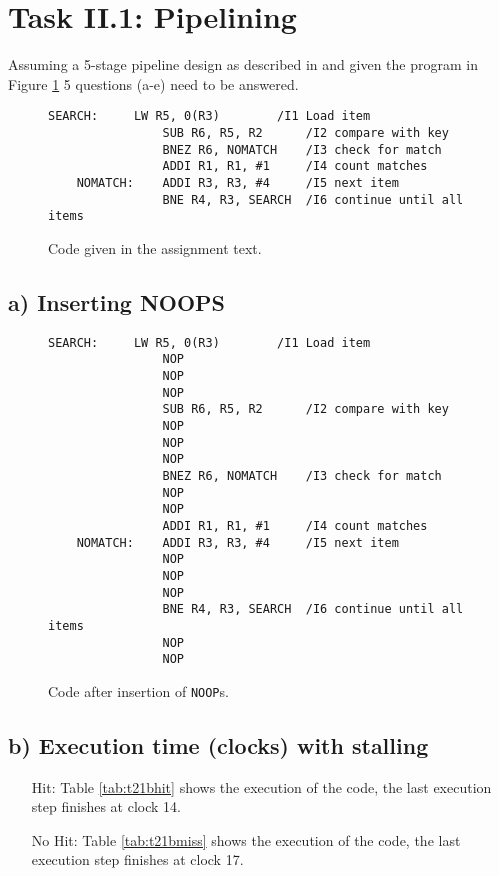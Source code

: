 \section{Task II.1: Pipelining}

Assuming a 5-stage pipeline design as described in \cite{l3InOrder} and given
the program in Figure \ref{fig:t21code} 5 questions (a-e) need to be answered.

\begin{figure}
    \begin{lstlisting}[language={[x86masm]Assembler}]
    SEARCH:     LW R5, 0(R3)        /I1 Load item
                SUB R6, R5, R2      /I2 compare with key
                BNEZ R6, NOMATCH    /I3 check for match
                ADDI R1, R1, #1     /I4 count matches
    NOMATCH:    ADDI R3, R3, #4     /I5 next item
                BNE R4, R3, SEARCH  /I6 continue until all items
    \end{lstlisting}
    \caption{Code given in the assignment text.}
    \label{fig:t21code}
\end{figure}

\subsection{a) Inserting NOOPS}

\begin{figure}
    \begin{lstlisting}[language={[x86masm]Assembler}]
    SEARCH:     LW R5, 0(R3)        /I1 Load item
                NOP
                NOP
                NOP
                SUB R6, R5, R2      /I2 compare with key
                NOP
                NOP
                NOP
                BNEZ R6, NOMATCH    /I3 check for match
                NOP
                NOP
                ADDI R1, R1, #1     /I4 count matches
    NOMATCH:    ADDI R3, R3, #4     /I5 next item
                NOP
                NOP
                NOP
                BNE R4, R3, SEARCH  /I6 continue until all items
                NOP
                NOP
    \end{lstlisting}
    \caption{Code after insertion of \texttt{NOOP}s.}
    \label{fig:t21a}
\end{figure}

\subsection{b) Execution time (clocks) with stalling}
\begin{itemize}
    \item[Hit: ] Table \ref{tab:t21bhit} shows  the execution of the code, the
    last execution step finishes at clock 14.

    \item[No Hit: ] Table \ref{tab:t21bmiss} shows  the execution of the code, the
    last execution step finishes at clock 17.
\end{itemize}

